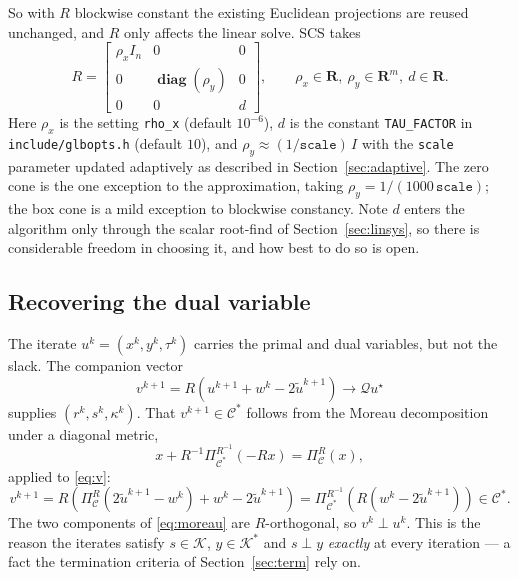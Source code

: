 \documentclass[11pt,a4paper]{article}
\newcommand{\R}{\mathbf{R}}
\newcommand{\K}{\mathcal{K}}
\newcommand{\C}{\mathcal{C}}
\newcommand{\Q}{\mathcal{Q}}
\newcommand{\proj}[1]{\Pi_{#1}}
\DeclareMathOperator{\diag}{\mathbf{diag}}
\theoremstyle{plain}
\begin{document}
So with $R$ blockwise constant the existing Euclidean projections are reused
unchanged, and $R$ only affects the linear solve. SCS takes
\begin{equation}\label{eq:R}
R = \begin{bmatrix} \rho_x I_n & 0 & 0 \\
                    0 & \diag(\rho_y) & 0 \\
                    0 & 0 & d \end{bmatrix},
\qquad \rho_x \in \R,\ \rho_y \in \R^m,\ d \in \R .
\end{equation}
Here $\rho_x$ is the setting \texttt{rho\_x} (default $10^{-6}$), $d$ is the
constant \texttt{TAU\_FACTOR} in \texttt{include/glbopts.h} (default $10$), and
$\rho_y \approx (1/\texttt{scale})\,I$ with the \texttt{scale} parameter
updated adaptively as described in Section~\ref{sec:adaptive}. The zero cone is
the one exception to the approximation, taking
$\rho_y = 1/(1000\,\texttt{scale})$; the box cone is a mild exception to
blockwise constancy. Note $d$ enters the algorithm only through the scalar
root-find of Section~\ref{sec:linsys}, so there is considerable freedom in
choosing it, and how best to do so is open.

\subsection{Recovering the dual variable}

The iterate $u^k = (x^k, y^k, \tau^k)$ carries the primal and dual variables,
but not the slack. The companion vector
\begin{equation}\label{eq:v}
v^{k+1} = R\left(u^{k+1} + w^k - 2\tilde u^{k+1}\right) \to \Q u^\star
\end{equation}
supplies $(r^k, s^k, \kappa^k)$. That $v^{k+1} \in \C^*$ follows from the
Moreau decomposition under a diagonal metric,
\begin{equation}\label{eq:moreau}
x + R^{-1}\proj{\C^*}^{R^{-1}}(-Rx) = \proj{\C}^{R}(x),
\end{equation}
applied to \eqref{eq:v}:
\[
v^{k+1}
= R\left(\proj{\C}^R(2\tilde u^{k+1} - w^k) + w^k - 2\tilde u^{k+1}\right)
= \proj{\C^*}^{R^{-1}}\!\left(R(w^k - 2\tilde u^{k+1})\right) \in \C^* .
\]
The two components of \eqref{eq:moreau} are $R$-orthogonal, so
$v^k \perp u^k$. This is the reason the iterates satisfy $s \in \K$,
$y \in \K^*$ and $s \perp y$ \emph{exactly} at every iteration --- a fact the
termination criteria of Section~\ref{sec:term} rely on.
\end{document}
